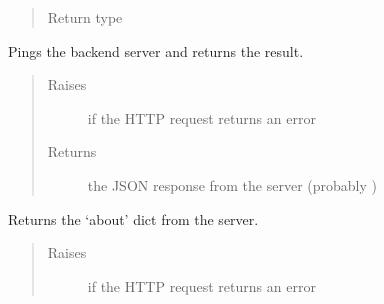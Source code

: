 \documentclass[letterpaper,10pt,english]{sphinxmanual}
\begin{document}
\begin{fulllineitems}
\begin{fulllineitems}
\begin{quote}
\begin{description}
\item[{Return type}] \leavevmode
\sphinxAtStartPar
{}

\end{description}\end{quote}

\end{fulllineitems}


\begin{fulllineitems}
\label{\detokenize{autoapi/pine/client/client/index:pine.client.client.PineClient.ping}}
\sphinxAtStartPar
Pings the backend server and returns the result.
\begin{quote}\begin{description}
\item[{Raises}] \leavevmode
\sphinxAtStartPar
{\hyperref[\detokenize{autoapi/pine/client/exceptions/index:pine.client.exceptions.PineClientHttpException}]{}} \textendash{} if the HTTP request returns an error

\item[{Returns}] \leavevmode
\sphinxAtStartPar
the JSON response from the server (probably )

\end{description}\end{quote}

\end{fulllineitems}


\begin{fulllineitems}
\label{\detokenize{autoapi/pine/client/client/index:pine.client.client.PineClient.about}}
\sphinxAtStartPar
Returns the ‘about’ dict from the server.
\begin{quote}\begin{description}
\item[{Raises}] \leavevmode
\sphinxAtStartPar
{\hyperref[\detokenize{autoapi/pine/client/exceptions/index:pine.client.exceptions.PineClientHttpException}]{}} \textendash{} if the HTTP request returns an error


\end{description}
\end{quote}
\end{fulllineitems}
\end{fulllineitems}
\end{document}
